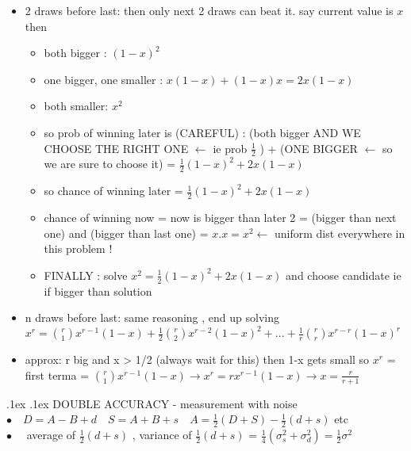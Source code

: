\documentclass[10pt,landscape,a4paper]{article}
\makeatletter
\renewcommand{\section}{\@startsection{section}{1}{0mm}%
                                {.1ex}%
                                {.1ex}%
                                {\color{blue}\sffamily\small\bfseries}}
\makeatother
\begin{document}
\begin{multicols*}{3}
\begin{spacing}{0.1}
\begin{itemize}[leftmargin=0.5cm]
\item 2 draws before last: then only next 2 draws can beat it. say current value is $x$ then  
\begin{itemize}[leftmargin=0.5cm]
\item both bigger : $(1-x)^2$
\item one bigger, one smaller : $x(1-x) + (1-x)x = 2x(1-x)$
\item both smaller: $x^2$
\item so prob of winning later is (CAREFUL) : (both bigger AND WE CHOOSE THE RIGHT ONE $\leftarrow$ ie prob  $\frac{1}{2}$ ) + (ONE BIGGER $\leftarrow$ so we are sure to choose it) = $\frac{1}{2}(1-x)^2 + 2x(1-x) $
\item so chance of winning later = $\frac{1}{2}(1-x)^2 + 2x(1-x) $
\item chance of winning now = now is bigger than later 2 = (bigger than next one) and (bigger than last one) = $x . x = x^2 \leftarrow$ uniform dist everywhere in this problem !
\item FINALLY : solve $x^2 = \frac{1}{2}(1-x)^2 + 2x(1-x) $ and choose candidate ie if bigger than solution
\end{itemize}

\item n draws before last: same reasoning , end up solving  $x^r = \binom{r}{1}x^{r-1}(1-x) + \frac{1}{2}\binom{r}{2}x^{r-2}(1-x)^2 + ... + \frac{1}{r}\binom{r}{r}x^{r-r}(1-x)^r$ 
\item approx: r big and x > 1/2 (always wait for this) then 1-x gets small so $x^r$ = first terma = $\binom{r}{1}x^{r-1}(1-x) \rightarrow x^r = rx^{r-1}(1-x) \rightarrow x = \frac{r}{r+1}$
\end{itemize}

\section{DOUBLE ACCURACY - measurement with noise}
$\bullet \quad D=A-B+d \quad S=A+B+s \quad A=\frac{1}{2}(D+S) - \frac{1}{2}(d+s)$ etc \\
$\bullet \quad$ average of $\frac{1}{2}(d+s)$ , variance of $\frac{1}{2}(d+s)$ = $\frac{1}{4} (\sigma_{s}^2 + \sigma_{d}^2) = \frac{1}{2} \sigma^2  $ 



\end{spacing}
\end{multicols*}
\end{document}
